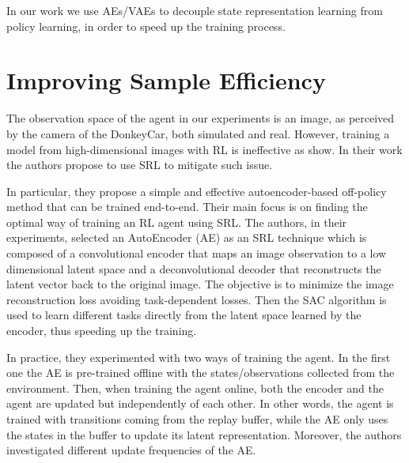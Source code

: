 In our work we use AEs/VAEs to decouple state representation learning from policy learning, in order to speed up the training process.

\section{Improving Sample Efficiency} \label{sec:sampleefficiency}
The observation space of the agent in our experiments is an image, as perceived by the camera of the DonkeyCar, both simulated and real. However, training a model from high-dimensional images with RL is ineffective as \citet{DBLP:journals/corr/abs-1910-01741} show. In their work the authors propose to use SRL to mitigate such issue. 


In particular, they propose a simple and effective autoencoder-based off-policy method that can be trained end-to-end. Their main focus is on finding the optimal way of training an RL agent using SRL. The authors, in their experiments, selected an AutoEncoder (AE) as an SRL technique which is composed of a convolutional encoder that maps an image observation to a low dimensional latent space and a deconvolutional decoder that reconstructs the latent vector back to the original image. The objective is to minimize the image reconstruction loss avoiding task-dependent losses. Then the SAC algorithm is used to learn different tasks directly from the latent space learned by the encoder, thus speeding up the training.

In practice, they experimented with two ways of training the agent. In the first one the AE is pre-trained offline with the states/observations collected from the environment. Then, when training the agent online, both the encoder and the agent are updated but independently of each other. In other words, the agent is trained with transitions coming from the replay buffer, while the AE only uses the states in the buffer to update its latent representation. Moreover, the authors investigated different update frequencies of the AE.

